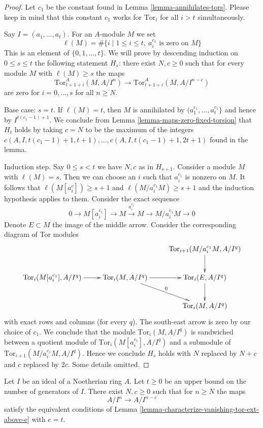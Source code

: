 \begin{proof}
Let $c_1$ be the constant found in Lemma \ref{lemma-annihilates-tors}.
Please keep in mind that this constant $c_1$ works for $\text{Tor}_i$ for all
$i > t$ simultaneously.

\medskip\noindent
Say $I = (a_1, \ldots, a_t)$. For an $A$-module $M$ we set
$$
\ell(M) =
\#\{i \mid 1 \leq i \leq t,\ a_i^{c_1}\text{ is zero on }M\}
$$
This is an element of $\{0, 1, \ldots, t\}$.
We will prove by descending induction on $0 \leq s \leq t$
the following statement $H_s$: there exist $N, c \geq 0$ such that
for every module $M$ with $\ell(M) \geq s$ the maps
$$
\text{Tor}_{t + 1 + i}^A(M, A/I^n) \to \text{Tor}_{t + 1 + i}^A(M, A/I^{n - c})
$$
are zero for $i = 0, \ldots, s$ for all $n \geq N$.

\medskip\noindent
Base case: $s = t$. If $\ell(M) = t$, then $M$ is annihilated by
$(a_1^{c_1}, \ldots, a_t^{c_1}\}$ and hence by
$I^{t(c_1 - 1) + 1}$. We conclude from
Lemma \ref{lemma-maps-zero-fixed-torsion}
that $H_t$ holds by taking $c = N$ to be the maximum of the integers
$c(A, I, t(c_1 - 1) + 1, t + 1), \ldots, c(A, I, t(c_1 - 1) + 1, 2t + 1)$
found in the lemma.

\medskip\noindent
Induction step. Say $0 \leq s < t$ we have $N, c$ as in $H_{s + 1}$.
Consider a module $M$ with $\ell(M) = s$. Then we can choose an $i$
such that $a_i^{c_1}$ is nonzero on $M$. It follows that
$\ell(M[a_i^c]) \geq s + 1$ and $\ell(M/a_i^{c_1}M) \geq s + 1$
and the induction hypothesis applies to them.
Consider the exact sequence
$$
0 \to M[a_i^{c_1}] \to M \xrightarrow{a_i^{c_1}} M \to M/a_i^{c_1}M \to 0
$$
Denote $E \subset M$ the image of the middle arrow.
Consider the corresponding diagram of Tor modules
$$
\xymatrix{
&
&
\text{Tor}_{i + 1}(M/a_i^{c_1}M, A/I^q) \ar[d] \\
\text{Tor}_i(M[a_i^{c_1}], A/I^q) \ar[r] &
\text{Tor}_i(M, A/I^q) \ar[r] \ar[rd]^0 &
\text{Tor}_i(E, A/I^q) \ar[d] \\
&
&
\text{Tor}_i(M, A/I^q)
}
$$
with exact rows and columns (for every $q$). The south-east arrow
is zero by our choice of $c_1$. We conclude that the
module $\text{Tor}_i(M, A/I^q)$ is sandwiched between
a quotient module of $\text{Tor}_i(M[a_i^{c_1}], A/I^q)$
and a submodule of $\text{Tor}_{i + 1}(M/a_i^{c_1}M, A/I^q)$.
Hence we conclude $H_s$ holds with $N$ replaced by $N + c$
and $c$ replaced by $2c$. Some details omitted.
\end{proof}

\begin{proposition}
\label{proposition-uniform-artin-rees}
Let $I$ be an ideal of a Noetherian ring $A$. Let $t \geq 0$
be an upper bound on the number of generators of $I$.
There exist $N, c \geq 0$ such that for $n \geq N$ the maps
$$
A/I^n \to A/I^{n - c}
$$
satisfy the equivalent conditions of
Lemma \ref{lemma-characterize-vanishing-tor-ext-above-e} with $e = t$.
\end{proposition}

